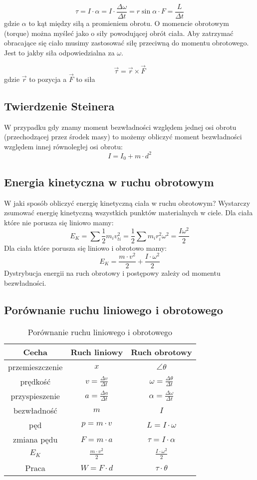\documentclass{../notatki}
\begin{document}
$$
\tau = I \cdot \alpha = I \cdot \frac{\Delta \omega}{\Delta t} =
r\sin\alpha \cdot F = \frac{L}{\Delta t}
$$
gdzie $\alpha$ to kąt między siłą a promieniem obrotu.
O momencie obrotowym (torque) można myśleć jako o siły powodującej obrót
ciała. Aby zatrzymać obracające się ciało musimy zastosować siłę przeciwną
do momentu obrotowego. Jest to jakby siła odpowiedzialna za $\omega$.

$$
\vec{\tau} = \vec{r} \times \vec{F}
$$
gdzie $\vec{r}$ to pozycja a $\vec{F}$ to siła

\subsection{Twierdzenie Steinera}

W przypadku gdy znamy moment bezwładności względem jednej osi obrotu
(przechodzącej przez środek masy) to możemy obliczyć moment bezwładności
względem innej równoległej osi obrotu:
$$
I = I_0 + m \cdot d^2
$$

\subsection{Energia kinetyczna w ruchu obrotowym}

W jaki sposób obliczyć energię kinetyczną ciała w ruchu obrotowym? Wystarczy
zsumować energię kinetyczną wszystkich punktów materialnych w ciele.
Dla ciała które nie porusza się liniowo mamy:
$$
E_K = \sum \frac{1}{2} m_i v_{ti}^2 = \frac{1}{2} \sum m_i r_i^2 \omega^2 =
\frac{I\omega^2}{2}
$$
Dla ciała które porusza się liniowo i obrotowo mamy:
$$
E_K = \frac{m \cdot v^2}{2} + \frac{I \cdot \omega^2}{2}
$$
Dystrybucja energii na ruch obrotowy i postępowy zależy od momentu bezwładności.

\subsection{Porównanie ruchu liniowego i obrotowego}

\begin{table*}[ht]
  \centering
  \begin{tabular}{c|c|c}
    Cecha & Ruch liniowy & Ruch obrotowy \\ \hline
    przemieszczenie & $x$ & $\angle \theta$ \\ \hline
    prędkość & $v = \frac{\Delta v}{\Delta t}$ & $\omega =
    \frac{\Delta \theta}{\Delta t}$ \\ \hline
    przyspieszenie & $a = \frac{\Delta a}{\Delta t}$ & $\alpha =
    \frac{\Delta \omega}{\Delta t}$ \\ \hline
    bezwładność & $m$ & $I$ \\ \hline
    pęd & $p = m \cdot v$ & $L = I \cdot \omega$ \\ \hline
    zmiana pędu & $F = m \cdot a$ & $\tau = I \cdot \alpha$ \\ \hline
    $E_K$ & $\frac{m \cdot v^2}{2}$ & $\frac{I \cdot \omega^2}{2}$ \\ \hline
    Praca & $W = F \cdot d$ & $\tau \cdot \theta$
  \end{tabular}
  \caption{Porównanie ruchu liniowego i obrotowego}
\end{table*}
\end{document}
